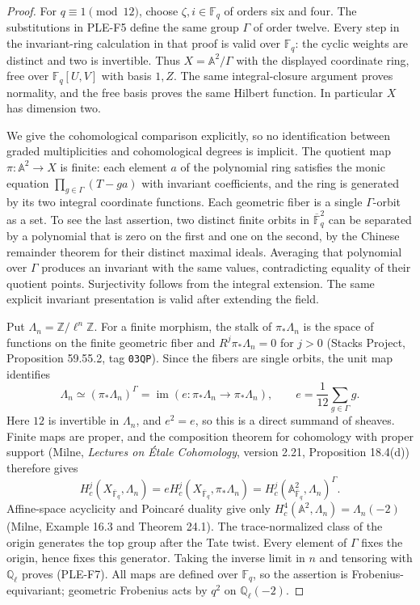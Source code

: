 \begin{proof}
For $q\equiv1\pmod{12}$, choose $\zeta,i\in\mathbb F_q$ of orders
six and four. The substitutions in PLE-F5 define the same group $\Gamma$
of order twelve. Every step in the invariant-ring calculation in that
proof is valid over $\mathbb F_q$: the cyclic weights are distinct and
two is invertible. Thus $X=\mathbb A^2/\Gamma$ with the displayed
coordinate ring, free over $\mathbb F_q[U,V]$ with basis $1,Z$.
The same integral-closure argument proves normality, and the free basis
proves the same Hilbert function. In particular $X$ has dimension two.

We give the cohomological comparison explicitly, so no identification
between graded multiplicities and cohomological degrees is implicit.
The quotient map $\pi:\mathbb A^2\to X$ is finite: each element $a$ of
the polynomial ring satisfies the monic equation
$\prod_{g\in\Gamma}(T-ga)$ with invariant coefficients, and the ring
is generated by its two integral coordinate functions.
Each geometric fiber is a single $\Gamma$-orbit as a set. To see the
last assertion, two distinct finite orbits in $\overline{\mathbb F}_q^2$
can be separated by a polynomial that is zero on the first and one on
the second, by the Chinese remainder theorem for their distinct maximal
ideals. Averaging that polynomial over $\Gamma$ produces an invariant
with the same values, contradicting equality of their quotient points.
Surjectivity follows from the integral extension. The same explicit
invariant presentation is valid after extending the field.

Put $\Lambda_n=\mathbb Z/\ell^n\mathbb Z$. For a finite morphism,
the stalk of $\pi_*\Lambda_n$ is the space of functions on the finite
geometric fiber and $R^j\pi_*\Lambda_n=0$ for $j>0$
(Stacks Project, Proposition 59.55.2, tag \texttt{03QP}). Since the fibers
are single orbits, the unit map identifies
\[
 \Lambda_n\simeq(\pi_*\Lambda_n)^\Gamma
 =\operatorname{im}\left(e:\pi_*\Lambda_n\to\pi_*\Lambda_n\right),
 \qquad e=\frac1{12}\sum_{g\in\Gamma}g.
\]
Here $12$ is invertible in $\Lambda_n$, and $e^2=e$, so this is a direct
summand of sheaves. Finite maps are proper, and the composition theorem
for cohomology with proper support (Milne, \emph{Lectures on \'Etale
Cohomology}, version 2.21, Proposition 18.4(d)) therefore gives
\[
 H_c^j(X_{\overline{\mathbb F}_q},\Lambda_n)
 =eH_c^j(X_{\overline{\mathbb F}_q},\pi_*\Lambda_n)
 =H_c^j(\mathbb A^2_{\overline{\mathbb F}_q},\Lambda_n)^\Gamma.
\]
Affine-space acyclicity and Poincar\'e duality give only
$H_c^4(\mathbb A^2,\Lambda_n)=\Lambda_n(-2)$
(Milne, Example 16.3 and Theorem 24.1).
The trace-normalized class of the origin generates the top group after
the Tate twist. Every element of $\Gamma$ fixes the origin, hence fixes
this generator. Taking the inverse limit in $n$ and tensoring with
$\mathbb Q_\ell$ proves (PLE-F7). All maps are defined over
$\mathbb F_q$, so the assertion is Frobenius-equivariant; geometric
Frobenius acts by $q^2$ on $\mathbb Q_\ell(-2)$.


\end{proof}
